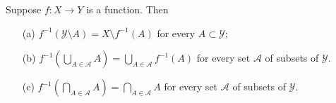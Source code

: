 \documentclass[11pt,a4paper]{book}
\begin{document}
\begin{prop}
   Suppose \( f: X \to Y  \) is a function. Then 
   \begin{enumerate}
       \item[(a)] \( f^{-1} (\mathcal{Y} \setminus  A ) = X \setminus  f^{-1}(A)  \) for every \( A \subset \mathcal{Y} \);
        \item[(b)] \( f^{-1}(\bigcup_{ A \in \mathcal{A} }^{  }  A ) = \bigcup_{ A \in \mathcal{A} }^{  } f^{-1}(A) \) for every set \( \mathcal{A} \) of subsets of \( \mathcal{Y} \).
        \item[(c)] \( f^{-1}(\bigcap_{  A \in \mathcal{A} }^{  } A ) = \bigcap_{  A \in \mathcal{A} }^{  } A  \) for every set \( \mathcal{A}  \) of subsets of \( \mathcal{Y} \).
   \end{enumerate}
\end{prop}
\end{document}

